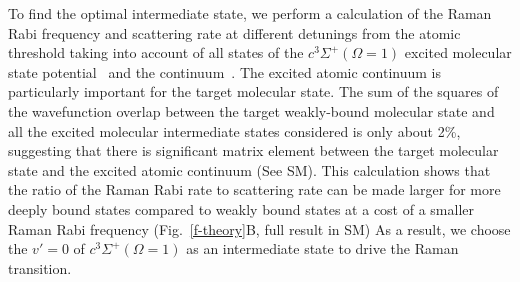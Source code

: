 \documentclass[aps,prl,twocolumn,superscriptaddress]{revtex4-1}
\begin{document}
To find the optimal intermediate state, we perform a  calculation of the Raman Rabi frequency and scattering rate at different detunings from the atomic threshold taking into account of all states of the $c^3\Sigma^+(\Omega = 1)$ excited molecular state potential~\cite{Grochola2011} and the continuum~\cite{Liu2017}. The excited atomic continuum is particularly important for the target molecular state. The sum of the squares of the wavefunction overlap between the target weakly-bound molecular state and all the excited molecular intermediate states considered is only about 2\%, suggesting that there is significant matrix element between the target molecular state and the excited atomic continuum (See SM).
This calculation shows that the ratio of the Raman Rabi rate to scattering rate can be made larger for more deeply bound states compared to weakly bound states at a cost of a smaller Raman Rabi frequency (Fig.~\ref{f-theory}B, full result in SM)
As a result, we choose %
the $v'=0$ of $c^3\Sigma^+(\Omega = 1)$ as an intermediate state to drive the Raman transition. %




\end{document}

